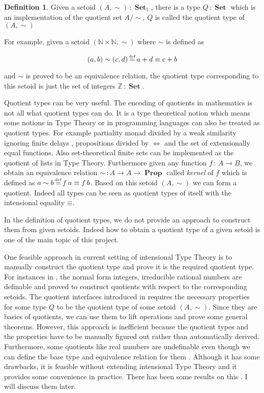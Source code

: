 \documentclass{article}
\newcommand{\Varid}[1]{\mathit{#1}}
\renewcommand\Varid[1]{\mathord{\textsf{#1}}}
\theoremstyle{definition}
\newtheorem{definition}{Definition}[section]
\newcommand{\N}{\mathbb{N}}
\newcommand{\Z}{\mathbb{Z}}
\DeclareMathOperator{\Prop}{\mathbf{Prop}}
\DeclareMathOperator{\Set}{\mathbf{Set}}
\DeclareMathOperator{\defi}{\stackrel{\text{\tiny def}}{=}}
\newcommand{\itt}{intensional Type Theory}
\begin{document}
\begin{definition}
Given a setoid $(A,\sim)\,\colon\Set_1$, there is a type
$Q\,\colon\Set$ which is an implementation of the quotient set $A/\sim$, $Q$ is called the quotient type of $(A,\sim)$
\end{definition}


For example, given a setoid $(\N\times\N , \sim)$ where $\sim$ is
defined as

\[(a , b) \sim (c , d) \defi  a + d \equiv c + b \]

and $\sim$ is proved to be an equivalence relation, 
the quotient type corresponding to this setoid is just the set of
integers $\Z\,\colon\Set$. 

Quotient types can be very useful. The encoding of quotients in mathematics is not all what quotient
types can do. It is a type theoretical notion which means some notions in Type
Theory or in programming languages can also be treated as quotient
types. For example partiality monad divided by a weak
similarity ignoring finite delays \cite{aan}, propositions divided by
$\iff$  and the set of extensionally equal functions. Also
set-theoretical finite sets can be implemented as the quotient of
lists in Type Theory. 
Furthermore given any function $f \,\colon\, A \to B$, we obtain an
equivalence relation $\sim \,\colon A \to A \to \Prop$ called \emph{kernel}
of $f$ which is defined as $a \sim b \defi f \,a \equiv f \,b$. Based on
this setoid $(A,\sim)$ we can form a quotient.
Indeed all types can be seen as quotient types of itself with the
intensional equality \ensuremath{\Varid{≡}}.


In the definition of quotient types, we do not provide an approach to
construct them from given setoids. Indeed how to obtain a
quotient type of a given setoid is one of the main topic of this
project.

One feasible approach in current setting of \itt{} is to manually construct
the quotient type and prove it is the required quotient type. For instances in
\cite{nuo:10}, the normal form integers, irreducible rational numbers
are definable and proved to construct quotients with respect to the
corresponding setoids. The quotient interfaces introduced in
\cite{aan} requires the necessary properties for some type $Q$ to be
the quotient type of some setoid $(A , \sim)$. Since they are basics
of quotients, we can use them to lift operations and prove some
general theorems. However, this approach is
inefficient because the quotient types and the properties have to be
manually figured out rather than automatically derived. 
Furthermore, some quotients like real numbers are undefinable even
though we can define the base type and equivalence relation for them
\cite{nuo:10} . Although it has some drawbacks, it is feasible without
extending \itt{} and it provides some convenience in practice. There
has been some results on this \cite{aan}. I will discuss them later. 
\end{document}
